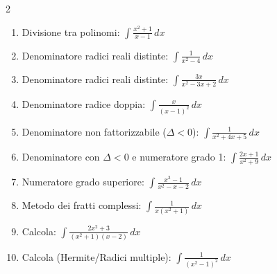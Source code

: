 \begin{multicols}{2}
\begin{enumerate}
    \item {} Divisione tra polinomi: $\int \frac{x^2+1}{x-1} \, dx$
    \item {} Denominatore radici reali distinte: $\int \frac{1}{x^2 - 4} \, dx$
    \item {} Denominatore radici reali distinte: $\int \frac{3x}{x^2 - 3x + 2} \, dx$
    \item {} Denominatore radice doppia: $\int \frac{x}{(x-1)^2} \, dx$
    \item {} Denominatore non fattorizzabile ($\Delta < 0$): $\int \frac{1}{x^2 + 4x + 5} \, dx$
    \item {} Denominatore con $\Delta < 0$ e numeratore grado 1: $\int \frac{2x+1}{x^2+9} \, dx$
    \item {} Numeratore grado superiore: $\int \frac{x^3 - 1}{x^2 - x - 2} \, dx$
    \item {} Metodo dei fratti complessi: $\int \frac{1}{x(x^2+1)} \, dx$
    \item {} Calcola: $\int \frac{2x^2+3}{(x^2+1)(x-2)} \, dx$
    \item {} Calcola (Hermite/Radici multiple): $\int \frac{1}{(x^2-1)^2} \, dx$
\end{enumerate}
\end{multicols}

